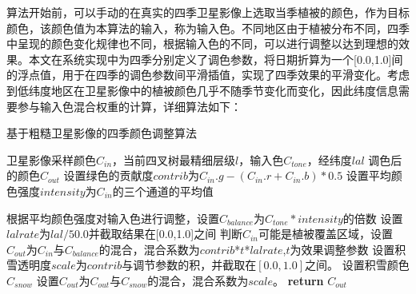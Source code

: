 算法开始前，可以手动的在真实的四季卫星影像上选取当季植被的颜色，作为目标颜色，该颜色值为本算法的输入，称为输入色。不同地区由于植被分布不同，四季中呈现的颜色变化规律也不同，根据输入色的不同，可以进行调整以达到理想的效果。本文在系统实现中为四季分别定义了调色参数，将日期折算为一个[0.0,1.0]间的浮点值，用于在四季的调色参数间平滑插值，实现了四季效果的平滑变化。考虑到低纬度地区在卫星影像中的植被颜色几乎不随季节变化而变化，因此纬度信息需要参与输入色混合权重的计算，详细算法如下：\par

\begin{algorithm}[H]
	\renewcommand{\algorithmicrequire}{\textbf{Input:}}
	\renewcommand{\algorithmicensure}{\textbf{Output:}}
	\caption{基于粗糙卫星影像的四季颜色调整算法}
	\label{alg:1}
	\begin{algorithmic}[1]
		\REQUIRE 卫星影像采样颜色$C_{in}$，当前四叉树最精细层级$l$，输入色$C_{tone}$，经纬度$lal$
		\newpage
		\ENSURE 调色后的颜色$C_{out}$
		\STATE 设置绿色的贡献度$contrib$为$C_{in}.g-(C_{in}.r+C_{in}.b)*0.5$
		\STATE 设置平均颜色强度$intensity$为$C_{in}$的三个通道的平均值
		
		\STATE 根据平均颜色强度对输入色进行调整，设置$C_{balance}$为$C_{tone}*intensity$的倍数
		\STATE 设置$lalrate$为$lal/50.0$并截取结果在[0.0,1.0]之间
	    \STATE 判断$C_{in}$可能是植被覆盖区域，设置$C_{out}$为$C_{in}$与$C_{balance}$的混合，混合系数为$contrib$*$t$*$lalrate$,$t$为效果调整参数
		\ENDIF
		\STATE 设置积雪透明度$scale$为$contrib$与调节参数的积，并截取在$[0.0,1.0]$之间。
		\STATE 设置积雪颜色$C_{snow}$
		\STATE 设置$C_{out}$为$C_{out}$与$C_{snow}$的混合，混合系数为$scale$。
		\ENDIF
		\STATE \textbf{return} $C_{out}$
	\end{algorithmic}  
\end{algorithm}
\newpage

